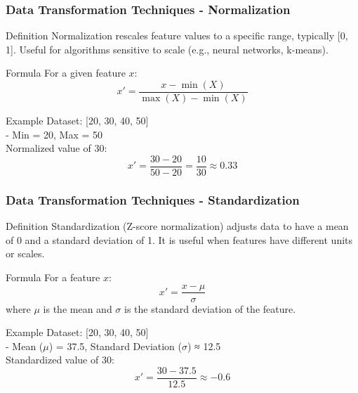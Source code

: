 \documentclass[aspectratio=169]{beamer}
\begin{document}
\begin{frame}[fragile]
    \frametitle{Data Transformation Techniques - Normalization}
    \begin{block}{Definition}
        Normalization rescales feature values to a specific range, typically [0, 1].
        Useful for algorithms sensitive to scale (e.g., neural networks, k-means).
    \end{block}
    \begin{block}{Formula}
        For a given feature \( x \):
        \[
        x' = \frac{x - \min(X)}{\max(X) - \min(X)}
        \]
    \end{block}
    \begin{block}{Example}
        Dataset: [20, 30, 40, 50] \\
        - Min = 20, Max = 50 \\
        Normalized value of 30:
        \[
        x' = \frac{30 - 20}{50 - 20} = \frac{10}{30} \approx 0.33
        \]
    \end{block}
\end{frame}

\begin{frame}[fragile]
    \frametitle{Data Transformation Techniques - Standardization}
    \begin{block}{Definition}
        Standardization (Z-score normalization) adjusts data to have a mean of 0 and a standard deviation of 1.
        It is useful when features have different units or scales.
    \end{block}
    \begin{block}{Formula}
        For a feature \( x \):
        \[
        x' = \frac{x - \mu}{\sigma}
        \]
        where \( \mu \) is the mean and \( \sigma \) is the standard deviation of the feature.
    \end{block}
    \begin{block}{Example}
        Dataset: [20, 30, 40, 50] \\
        - Mean (\( \mu \)) = 37.5, Standard Deviation (\( \sigma \)) ≈ 12.5 \\
        Standardized value of 30:
        \[
        x' = \frac{30 - 37.5}{12.5} \approx -0.6
        \]
    \end{block}
\end{frame}
\end{document}

